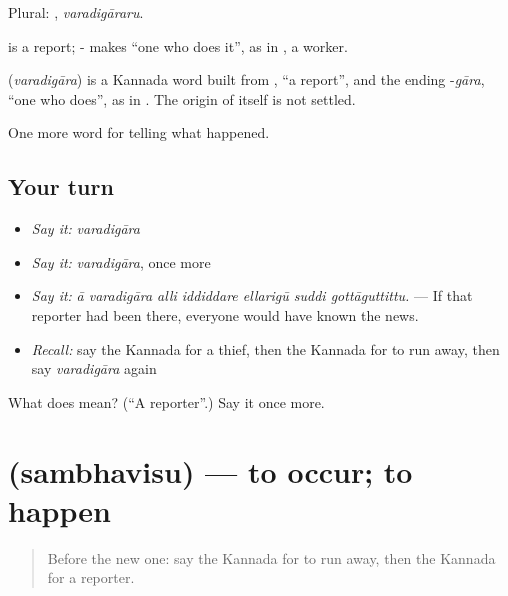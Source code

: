 Plural: , \emph{varadigāraru}.

 is a report; - makes \textquotedblleft{}one who does it\textquotedblright{}, as in , a worker.

\begin{cousinweb}
\textbf{} (\emph{varadigāra}) is a Kannada word built from , \textquotedblleft{}a report\textquotedblright{}, and the ending -\emph{gāra}, \textquotedblleft{}one who does\textquotedblright{}, as in . The origin of  itself is not settled.
\end{cousinweb}

\begin{grammarlens}[title={What you've built}]
One more word for telling what happened.
\end{grammarlens}

\subsection*{Your turn}
\begin{itemize}
\raggedright
  \item \emph{Say it:} \emph{varadigāra}
  \item \emph{Say it:} \emph{varadigāra}, once more
  \item \emph{Say it:} \emph{ā varadigāra alli iddiddare ellarigū suddi gottāguttittu.} — If that reporter had been there, everyone would have known the news.
  \item \emph{Recall:} say the Kannada for a thief, then the Kannada for to run away, then say \emph{varadigāra} again
\end{itemize}

\begin{tcolorbox}[breakable,colback=teal!4,colframe=teal!35!black,title={Before you move on}]
What does  mean? (\textquotedblleft{}A reporter\textquotedblright{}.) Say it once more.
\end{tcolorbox}
\section[\texorpdfstring{\kn{ಸಂಭವಿಸು} (sambhavisu)}{ಸಂಭವಿಸು (sambhavisu)}]{ (sambhavisu) — to occur; to happen}

\label{lesson:KA-C320-sambhavisu}



\begin{quote}
Before the new one: say the Kannada for to run away, then the Kannada for a reporter.
\end{quote}

